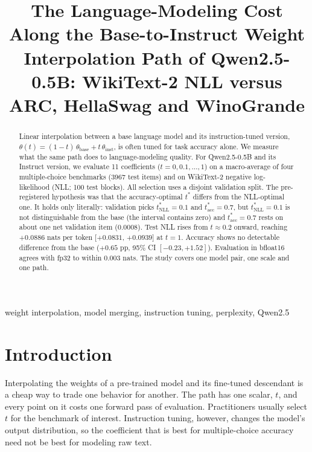 \documentclass[conference]{IEEEtran}
\begin{document}
\title{The Language-Modeling Cost Along the Base-to-Instruct Weight Interpolation Path of Qwen2.5-0.5B: WikiText-2 NLL versus ARC, HellaSwag and WinoGrande}

\author{
}

\maketitle

\begin{abstract}
Linear interpolation between a base language model and its instruction-tuned version, $\theta(t)=(1-t)\,\theta_{\text{base}}+t\,\theta_{\text{inst}}$, is often tuned for task accuracy alone. We measure what the same path does to language-modeling quality. For Qwen2.5-0.5B and its Instruct version, we evaluate 11 coefficients ($t=0,0.1,\dots,1$) on a macro-average of four multiple-choice benchmarks (3967 test items) and on WikiText-2 negative log-likelihood (NLL; 100 test blocks). All selection uses a disjoint validation split. The pre-registered hypothesis was that the accuracy-optimal $t^\ast$ differs from the NLL-optimal one. It holds only literally: validation picks $t^\ast_{\mathrm{NLL}}=0.1$ and $t^\ast_{\mathrm{acc}}=0.7$, but $t^\ast_{\mathrm{NLL}}=0.1$ is not distinguishable from the base (the interval contains zero) and $t^\ast_{\mathrm{acc}}=0.7$ rests on about one net validation item ($0.0008$). Test NLL rises from $t\approx0.2$ onward, reaching $+0.0886$ nats per token [$+0.0831$, $+0.0939$] at $t=1$. Accuracy shows no detectable difference from the base ($+0.65$ pp, 95\% CI $[-0.23,+1.52]$). Evaluation in bfloat16 agrees with fp32 to within 0.003 nats. The study covers one model pair, one scale and one path.
\end{abstract}

\begin{IEEEkeywords}
weight interpolation, model merging, instruction tuning, perplexity, Qwen2.5
\end{IEEEkeywords}

\section{Introduction}
Interpolating the weights of a pre-trained model and its fine-tuned descendant is a cheap way to trade one behavior for another. The path has one scalar, $t$, and every point on it costs one forward pass of evaluation. Practitioners usually select $t$ for the benchmark of interest. Instruction tuning, however, changes the model's output distribution, so the coefficient that is best for multiple-choice accuracy need not be best for modeling raw text.
\end{document}
